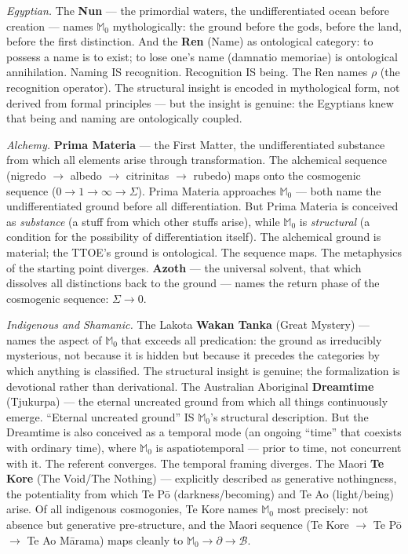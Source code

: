 \documentclass[10pt, openany, oneside]{book}
\begin{document}
\textit{Egyptian.} The \textbf{Nun} --- the primordial waters, the undifferentiated ocean before creation --- names $\mathbb{M}_0$ mythologically: the ground before the gods, before the land, before the first distinction. And the \textbf{Ren} (Name) as ontological category: to possess a name is to exist; to lose one's name (damnatio memoriae) is ontological annihilation. Naming IS recognition. Recognition IS being. The Ren names $\rho$ (the recognition operator). The structural insight is encoded in mythological form, not derived from formal principles --- but the insight is genuine: the Egyptians knew that being and naming are ontologically coupled.

\textit{Alchemy.} \textbf{Prima Materia} --- the First Matter, the undifferentiated substance from which all elements arise through transformation. The alchemical sequence (nigredo $\to$ albedo $\to$ citrinitas $\to$ rubedo) maps onto the cosmogenic sequence ($0 \to 1 \to \infty \to \Sigma$). Prima Materia approaches $\mathbb{M}_0$ --- both name the undifferentiated ground before all differentiation. But Prima Materia is conceived as \textit{substance} (a stuff from which other stuffs arise), while $\mathbb{M}_0$ is \textit{structural} (a condition for the possibility of differentiation itself). The alchemical ground is material; the TTOE's ground is ontological. The sequence maps. The metaphysics of the starting point diverges. \textbf{Azoth} --- the universal solvent, that which dissolves all distinctions back to the ground --- names the return phase of the cosmogenic sequence: $\Sigma \to 0$.

\textit{Indigenous and Shamanic.} The Lakota \textbf{Wakan Tanka} (Great Mystery) --- names the aspect of $\mathbb{M}_0$ that exceeds all predication: the ground as irreducibly mysterious, not because it is hidden but because it precedes the categories by which anything is classified. The structural insight is genuine; the formalization is devotional rather than derivational. The Australian Aboriginal \textbf{Dreamtime} (Tjukurpa) --- the eternal uncreated ground from which all things continuously emerge. ``Eternal uncreated ground'' IS $\mathbb{M}_0$'s structural description. But the Dreamtime is also conceived as a temporal mode (an ongoing ``time'' that coexists with ordinary time), where $\mathbb{M}_0$ is aspatiotemporal --- prior to time, not concurrent with it. The referent converges. The temporal framing diverges. The Maori \textbf{Te Kore} (The Void/The Nothing) --- explicitly described as generative nothingness, the potentiality from which Te P\={o} (darkness/becoming) and Te Ao (light/being) arise. Of all indigenous cosmogonies, Te Kore names $\mathbb{M}_0$ most precisely: not absence but generative pre-structure, and the Maori sequence (Te Kore $\to$ Te P\={o} $\to$ Te Ao M\={a}rama) maps cleanly to $\mathbb{M}_0 \to \partial \to \mathcal{B}$.
\end{document}
